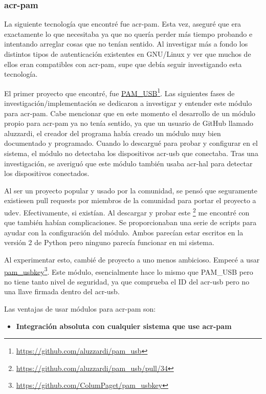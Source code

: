 \documentclass[twoside, titlepage, 12pt, a4paper]{article}
\begin{document}
{\subsubsection{\gls{acr-pam}}
La siguiente tecnología que encontré fue \gls{acr-pam}. Esta vez, aseguré que era exactamente lo que necesitaba ya que no quería perder más tiempo probando e intentando arreglar cosas que no tenían sentido. Al investigar más a fondo los distintos tipos de autenticación existentes en \gls{GNU/Linux} y ver que muchos de ellos eran compatibles con \gls{acr-pam}, supe que debía seguir investigando esta tecnología. \par
El primer proyecto que encontré, fue \href{https://github.com/aluzzardi/pam_usb}{PAM\_USB}\footnote{\url{https://github.com/aluzzardi/pam_usb}}. Las siguientes fases de investigación/implementación se dedicaron a investigar y entender este módulo para \gls{acr-pam}. Cabe mencionar que en este momento el desarrollo de un módulo propio para \gls{acr-pam} ya no tenía sentido, ya que un usuario de \gls{GitHub} llamado aluzzardi, el creador del programa había creado un módulo muy bien documentado y programado. Cuando lo descargué para probar y configurar en el sistema, el módulo no detectaba los dispositivos \gls{acr-usb} que conectaba. Tras una investigación, se averiguó que este módulo también usaba \gls{acr-hal} para detectar los dispositivos conectados.\par
Al ser un proyecto popular y usado por la comunidad, se pensó que seguramente existiesen pull requests por miembros de la comunidad para portar el proyecto a \gls{udev}. Efectivamente, si existían. Al descargar y probar este \footnote{\url{https://github.com/aluzzardi/pam_usb/pull/34}} me encontré con que también habían complicaciones. Se proporcionaban una serie de scripts para ayudar con la configuración del módulo. Ambos parecían estar escritos en la versión 2 de Python pero ninguno parecía funcionar en mi sistema.\par Al experimentar esto, cambié de proyecto a uno menos ambicioso. Empecé a usar \href{https://github.com/ColumPaget/pam_usbkey}{pam\_usbkey}\footnote{\url{https://github.com/ColumPaget/pam_usbkey}}. Este módulo, esencialmente hace lo mismo que PAM\_USB pero no tiene tanto nivel de seguridad, ya que comprueba el ID del \gls{acr-usb} pero no una llave firmada dentro del \gls{acr-usb}. \par
Las ventajas de usar módulos para \gls{acr-pam} son:
\begin{itemize}
	\item{\textbf{Integración absoluta con cualquier sistema que use \gls{acr-pam}}}\par

\end{itemize}}
\end{document}
